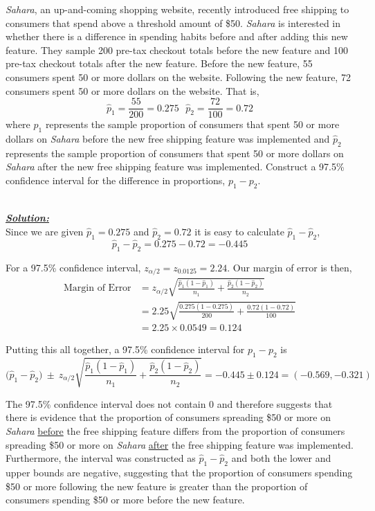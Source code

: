 \begin{example}
\textit{Sahara}, an up-and-coming shopping website, recently introduced free shipping to consumers that spend above a threshold amount of \$50. \textit{Sahara} is interested in whether there is a difference in spending habits before and after adding this new feature. They sample 200 pre-tax checkout totals before the new feature and 100 pre-tax checkout totals after the new feature. Before the new feature, 55 consumers spent 50 or more dollars on the website. Following the new feature, 72 consumers spent 50 or more dollars on the website. That is,
\[ \hat{p}_1 = \frac{55}{200}=0.275 ~~~ \hat{p}_2 = \frac{72}{100} = 0.72\]
where $\hat{p}_1$ represents the sample proportion of consumers that spent 50 or more dollars on \textit{Sahara} before the new free shipping feature was implemented and $\hat{p}_2$ represents the sample proportion of consumers that spent 50 or more dollars on \textit{Sahara} after the new free shipping feature was implemented.
Construct a 97.5\% confidence interval for the difference in proportions, $p_1 - p_2$. 


\hfill\\
{\emph{\textbf{\underline{Solution:}}}}\\


Since we are given $\hat{p}_1 = 0.275$ and $\hat{p}_2=0.72$ it is easy to calculate $\hat{p}_1 - \hat{p}_2$,
\[ \hat{p}_1 - \hat{p}_2 = 0.275-0.72 = -0.445 \]

For a 97.5\% confidence interval, $z_{\alpha/2}=z_{0.0125} = 2.24$. Our margin of error is then,
\begin{align*}
\text{Margin of Error} &= z_{\alpha / 2}  
\sqrt{ \frac{ \hat{p}_{1} (1 - \hat{p}_{1}) }{ n_{1}}		+	\frac{ \hat{p}_{2} (1 - \hat{p}_{2}) }{ n_{2}} } \\
&= 2.25 \sqrt{ \frac{0.275 (1-0.275)}{200} + \frac{0.72(1-0.72)}{100}} \\
&= 2.25 \times 0.0549 = 0.124
\end{align*}

Putting this all together, a 97.5\% confidence interval for $p_1-p_2$ is
\[ \big(\hat{p}_{1}	- \hat{p}_{2}\big)	~\pm~		z_{\alpha / 2}  
\sqrt{ \frac{ \hat{p}_{1} (1 - \hat{p}_{1}) }{ n_{1}}		+	\frac{ \hat{p}_{2} (1 - \hat{p}_{2}) }{ n_{2}} } = -0.445 \pm 0.124 = (-0.569,-0.321)\]

The 97.5\% confidence interval does not contain 0 and therefore suggests that there is evidence that the proportion of consumers spreading \$50 or more on \textit{Sahara} \underline{before} the free shipping feature differs from the proportion of consumers spreading \$50 or more on \textit{Sahara} \underline{after} the free shipping feature was implemented. Furthermore, the interval was constructed as $\hat{p}_{1} - \hat{p}_{2}$ and both the lower and upper bounds are negative, suggesting that the proportion of consumers spending \$50 or more following the new feature is greater than the proportion of consumers spending \$50 or more before the new feature.
\end{example}












